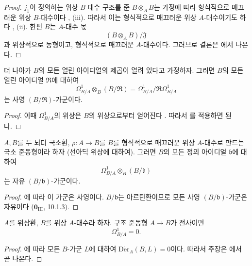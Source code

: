 \begin{proof}
$j_1$이 정의하는 위상 $B$-대수 구조를 준 $B\otimes_A B$는 가정에
따라 형식적으로 매끄러운 위상 $B$-대수이다
, (iii). 따라서 이는 형식적으로 매끄러운 위상
$A$-대수이기도 하다 , (ii). 한편 $B$는
$A$-대수 몫
\[
  (B\otimes_A B)/\mathfrak J
\]
과 위상적으로 동형이고, 형식적으로 매끄러운 $A$-대수이다. 그러므로
결론은 에서 나온다.
\end{proof}

\begin{corollary}[20.4.10]
\label{0.20.4.10-ko}
더 나아가 $B$의 모든 열린 아이디얼의 제곱이 열려 있다고 가정하자.
그러면 $B$의 모든 열린 아이디얼 $\mathfrak R$에 대하여
\[
  \Omega^1_{B/A}\otimes_B(B/\mathfrak R)
  =\Omega^1_{B/A}/\mathfrak R\Omega^1_{B/A}
\]
는 사영 $(B/\mathfrak R)$-가군이다.
\end{corollary}

\begin{proof}
이때 $\Omega^1_{B/A}$의 위상은 $B$의 위상으로부터 얻어진다
. 따라서 를 적용하면 된다.
\end{proof}

\begin{corollary}[20.4.11]
\label{0.20.4.11-ko}
$A,B$를 두 뇌터 국소환, $\rho:A\to B$를 $B$를 형식적으로
매끄러운 위상 $A$-대수로 만드는 국소 준동형이라 하자 (선아딕
위상에 대하여). 그러면 $B$의 모든 정의 아이디얼 $\mathfrak b$에
대하여
\[
  \Omega^1_{B/A}\otimes_B(B/\mathfrak b)
\]
는 자유 $(B/\mathfrak b)$-가군이다.
\end{corollary}

\begin{proof}
에 따라 이 가군은 사영이다. $B/\mathfrak b$는
아르틴환이므로 모든 사영 $(B/\mathfrak b)$-가군은 자유이다
($\mathbf 0_{\mathrm{III}}$, 10.1.3).
\end{proof}

\begin{proposition}[20.4.12]
\label{0.20.4.12-ko}
$A$를 위상환, $B$를 위상 $A$-대수라 하자. 구조 준동형
$A\to B$가 전사이면
\[
  \Omega^1_{B/A}=0.
\]
\end{proposition}

\begin{proof}
에 따라 모든 $B$-가군 $L$에 대하여
$\operatorname{D\acute{e}r}_A(B,L)=0$이다. 따라서 주장은
에서 곧 나온다.
\end{proof}


